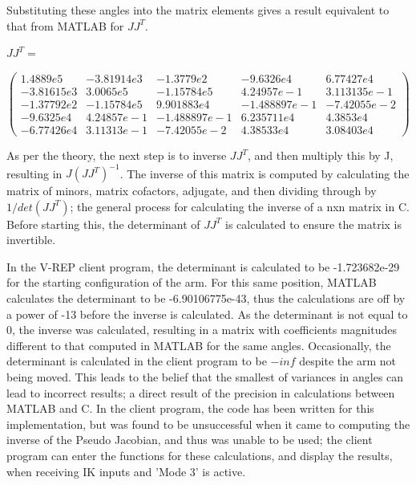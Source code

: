 \documentclass[12pt,openany,a4paper]{book}
\begin{document}
Substituting these angles into the matrix elements gives a result equivalent to that from MATLAB for $J J^T$.

\vspace{\baselineskip}
$J J^T = $
\begin{center}

$ \left(\begin{array}{ccccc} 
1.4889e5 & -3.81914e3 & -1.3779e2 & -9.6326e4 & 6.77427e4 \\ 
-3.81615e3 & 3.0065e5 & -1.15784e5 & 4.24957e-1 & 3.113135e-1 \\ 
-1.37792e2 & -1.15784e5 & 9.901883e4 & -1.488897e-1 & -7.42055e-2 \\ -9.6325e4 & 4.24857e-1 & -1.488897e-1 & 6.235711e4 & 4.3853e4 \\
-6.77426e4 & 3.11313e-1 & -7.42055e-2 & 4.38533e4 & 3.08403e4 

\end{array}\right)
$
\end{center}
\vspace{\baselineskip}
As per the theory, the next step is to inverse $J J^T$, and then multiply this by J, resulting in $J (J J^T)^{-1}$. The inverse of this matrix is computed by calculating the matrix of minors, matrix cofactors, adjugate, and then dividing through by $1/det(JJ^T)$; the general process for calculating the inverse of a nxn matrix in C. Before starting this, the determinant of $J J^T$ is calculated to ensure the matrix is invertible.

In the V-REP client program, the determinant is calculated to be -1.723682e-29 for the starting configuration of the arm. For this same position, MATLAB calculates the determinant to be -6.90106775e-43, thus the calculations are off by a power of -13 before the inverse is calculated. As the determinant is not equal to 0, the inverse was calculated, resulting in a matrix with coefficients magnitudes different to that computed in MATLAB for the same angles. Occasionally, the determinant is calculated in the client program to be $-inf$ despite the arm not being moved. This leads to the belief that the smallest of variances in angles can lead to incorrect results; a direct result of the precision in calculations between MATLAB and C. In the client program, the code has been written for this implementation, but was found to be unsuccessful when it came to computing the inverse of the Pseudo Jacobian, and thus was unable to be used; the client program can enter the functions for these calculations, and display the results, when receiving IK inputs and 'Mode 3' is active.
\end{document}
